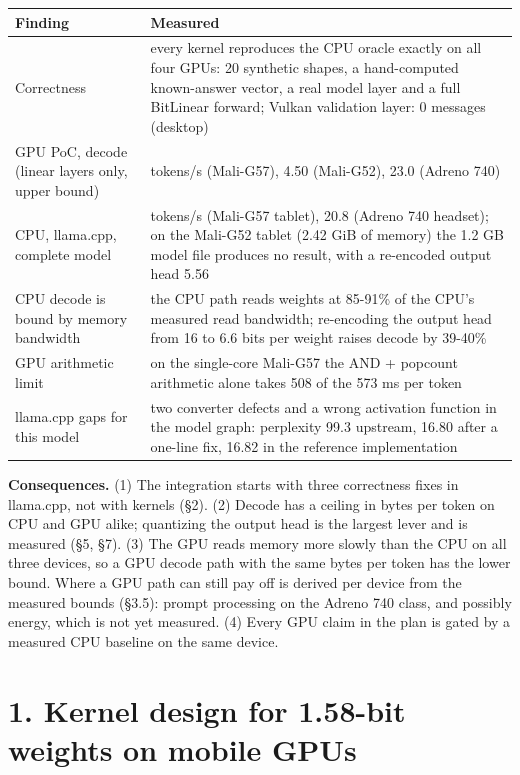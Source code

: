 \documentclass[
  10pt,
]{article}
\newcounter{none} %
\begin{document}
{\def\LTcaptype{none} %
\begin{longtable}[]{@{}
  >{\raggedright\arraybackslash}p{}
  >{\raggedright\arraybackslash}p{}@{}}
\toprule\noalign{}
Finding & Measured \\
\midrule\noalign{}
\endhead%
\bottomrule\noalign{}
\endlastfoot%
Correctness & every kernel reproduces the CPU oracle exactly on all four
GPUs: 20 synthetic shapes, a hand-computed known-answer vector, a real
model layer and a full BitLinear forward; Vulkan validation layer: 0
messages (desktop) \\
GPU PoC, decode (linear layers only, upper bound) & 1.74 tokens/s
(Mali-G57), 4.50 (Mali-G52), 23.0 (Adreno 740) \\
CPU, llama.cpp, complete model & 2.56 tokens/s (Mali-G57 tablet), 20.8
(Adreno 740 headset); on the Mali-G52 tablet (2.42 GiB of memory) the
1.2 GB model file produces no result, with a re-encoded output head
5.56 \\
CPU decode is bound by memory bandwidth & the CPU path reads weights at
85-91\% of the CPU's measured read bandwidth; re-encoding the output
head from 16 to 6.6 bits per weight raises decode by 39-40\% \\
GPU arithmetic limit & on the single-core Mali-G57 the AND + popcount
arithmetic alone takes 508 of the 573 ms per token \\
llama.cpp gaps for this model & two converter defects and a wrong
activation function in the model graph: perplexity 99.3 upstream, 16.80
after a one-line fix, 16.82 in the reference implementation \\
\end{longtable}
}

\textbf{Consequences.} (1) The integration starts with three
correctness fixes in llama.cpp, not with kernels (\S{}2). (2) Decode has
a ceiling in bytes per token on CPU and GPU alike; quantizing the output
head is the largest lever and is measured (\S{}5, \S{}7). (3) The GPU
reads memory more slowly than the CPU on all three devices, so a GPU
decode path with the same bytes per token has the lower bound. Where a
GPU path can still pay off is derived per device from the measured
bounds (\S{}3.5): prompt processing on the Adreno 740 class, and
possibly energy, which is not yet measured. (4) Every GPU claim in the
plan is gated by a measured CPU baseline on the same device.

\section{1. Kernel design for 1.58-bit weights on mobile GPUs}\label{kernel-design-for-1.58-bit-weights-on-mobile-gpus}
\end{document}

